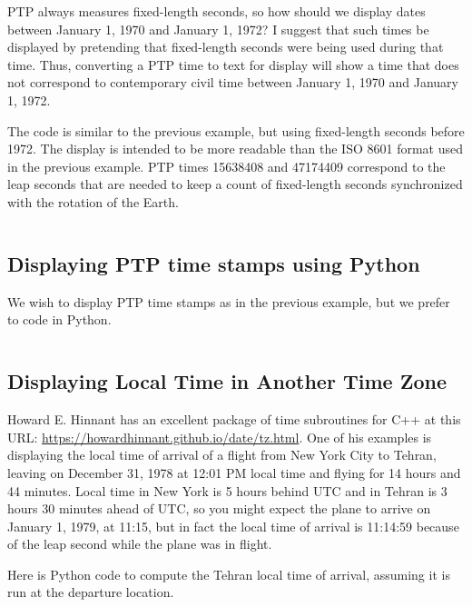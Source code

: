 \documentclass[letterpaper,twoside]{article}
\begin{document}
PTP always measures fixed-length seconds, so how should we display
dates between January 1, 1970 and January 1, 1972?  I suggest that
such times be displayed by pretending that fixed-length seconds
were being used during that time.  Thus, converting a PTP time
to text for display will show a time that does not correspond to
contemporary civil time between January 1, 1970 and January 1, 1972.

The code is similar to the previous example, but using
fixed-length seconds before 1972.  The display is intended to be
more readable than the ISO 8601 format used in the previous example.
PTP times \num{15638408} and \num{47174409} correspond to the leap
seconds that are needed to keep a count of fixed-length seconds
synchronized with the rotation of the Earth.

\inputminted[firstline=41,lastline=74]{c}{examples/example_05.c}

\subsection{Displaying PTP time stamps using Python}
\label{example:PTP_using_Python}
We wish to display PTP time stamps as in the previous example,
but we prefer to code in Python.

\inputminted[firstline=27,lastline=69]{Python}{examples/example_06.py}

\subsection{Displaying Local Time in Another Time Zone}
Howard E. Hinnant has an excellent package of time subroutines
for C++ at this URL: \url{https://howardhinnant.github.io/date/tz.html}.
One of his examples is displaying the local time of arrival of a flight
from New York City to Tehran, leaving on December 31, 1978 at 12:01 PM
local time and flying for 14 hours and 44 minutes.  Local time in
New York is 5 hours behind UTC and in Tehran is 3 hours 30 minutes
ahead of UTC, so you might expect the plane to arrive on
January 1, 1979, at 11:15, but in fact the local time of arrival
is 11:14:59 because of the leap second while the plane was in flight.

Here is Python code to compute the Tehran local time of arrival,
assuming it is run at the departure location.
\end{document}
